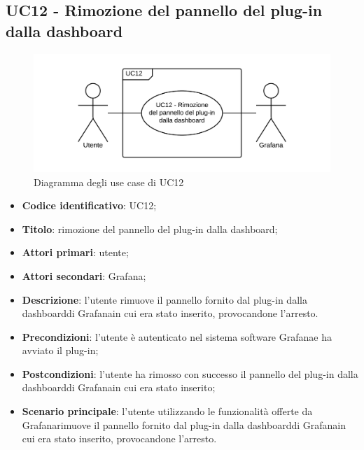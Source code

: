 \subsection{UC12 - Rimozione del pannello del plug-in dalla dashboard}
\begin{figure}[H]
\includegraphics{img/UC12_-_Rimozione_del_pannello_del_plug-in_dalla_dashboard.png}
\caption{Diagramma degli use case di UC12}
\end{figure}
\begin{itemize}
    \item \textbf{Codice identificativo}: UC12;
    \item \textbf{Titolo}: rimozione del pannello del plug-in dalla dashboard\glo;
    \item \textbf{Attori primari}: utente;
    \item \textbf{Attori secondari}: Grafana\glo;
    \item \textbf{Descrizione}: l'utente rimuove il pannello fornito dal plug-in dalla dashboard\glosp di Grafana\glosp in cui era stato inserito, provocandone l'arresto.
    \item \textbf{Precondizioni}: l'utente è autenticato nel sistema software Grafana\glosp e ha avviato il plug-in;
    \item \textbf{Postcondizioni}: l'utente ha rimosso con successo il pannello del plug-in dalla dashboard\glosp di Grafana\glo in cui era stato inserito;
    \item \textbf{Scenario principale}: l'utente utilizzando le funzionalità offerte da Grafana\glosp rimuove il pannello fornito dal plug-in dalla dashboard\glosp di Grafana\glosp in cui era stato inserito, provocandone l'arresto.
\end{itemize}

